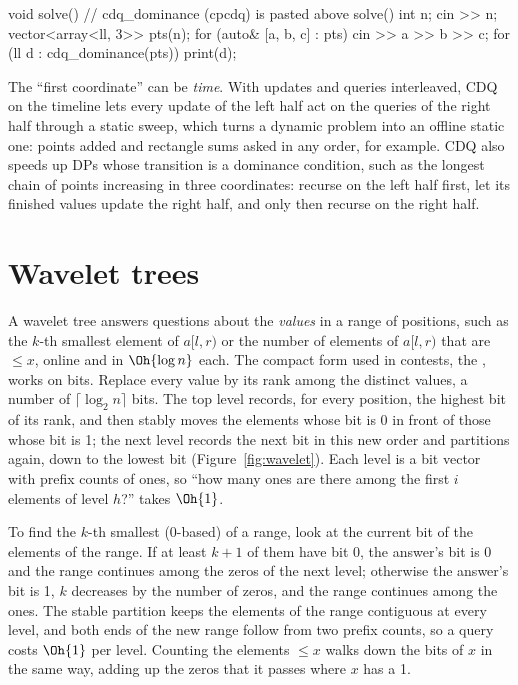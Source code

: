 \begin{code}
void solve() {  // cdq_dominance (cpcdq) is pasted above solve()
    int n;
    cin >> n;
    vector<array<ll, 3>> pts(n);
    for (auto& [a, b, c] : pts) cin >> a >> b >> c;
    for (ll d : cdq_dominance(pts)) print(d);
}
\end{code}


\begin{trick}
The ``first coordinate'' can be \emph{time}. With updates and queries interleaved, CDQ on the timeline lets every update of the left
half act on the queries of the right half through a static sweep, which turns a dynamic problem into an offline static one: points
added and rectangle sums asked in any order, for example. CDQ also speeds up DPs whose transition is a dominance condition, such as
the longest chain of points increasing in three coordinates: recurse on the left half first, let its finished values update the right
half, and only then recurse on the right half.
\end{trick}

\section[Wavelet trees]{Wavelet trees \hfill \ioi}\label{sec:wavelet}

A wavelet tree answers questions about the \emph{values} in a range of positions, such as the $k$-th smallest element of $a[l, r)$ or
the number of elements of $a[l, r)$ that are $\le x$, online and in $\Oh{\log n}$ each. The compact form used in contests, the
, works on bits. Replace every value by its rank among the distinct values, a number of $\lceil \log_2 n \rceil$
bits. The top level records, for every position, the highest bit of its rank, and then stably moves the elements whose bit is 0 in
front of those whose bit is 1; the next level records the next bit in this new order and partitions again, down to the lowest bit
(Figure~\ref{fig:wavelet}). Each level is a bit vector with prefix counts of ones, so ``how many ones are there among the first $i$
elements of level $h$?'' takes $\Oh{1}$.

To find the $k$-th smallest (0-based) of a range, look at the current bit of the elements of the range. If at least $k + 1$ of them
have bit 0, the answer's bit is 0 and the range continues among the zeros of the next level; otherwise the answer's bit is 1, $k$
decreases by the number of zeros, and the range continues among the ones. The stable partition keeps the elements of the range
contiguous at every level, and both ends of the new range follow from two prefix counts, so a query costs $\Oh{1}$ per level.
Counting the elements $\le x$ walks down the bits of $x$ in the same way, adding up the zeros that it passes where $x$ has a 1.

